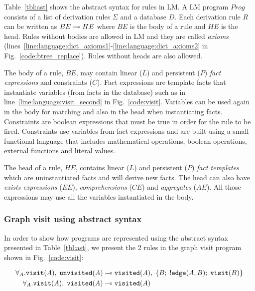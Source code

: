 Table~\ref{tbl:ast} shows the abstract syntax for rules in LM.  A LM program
$Prog$ consists of a list of derivation rules $\Sigma$ and a database $D$.  Each
derivation rule $R$ can be written as $BE \multimap HE$ where $BE$ is the body of a
rule and $HE$ is the head. Rules without bodies are allowed in LM and they are
called \textit{axioms}
(lines~\ref{line:language:dict_axioms1}-\ref{line:language:dict_axioms2} in
Fig.~\ref{code:btree_replace}). Rules without heads are also allowed.

The body of a rule, $BE$, may contain linear ($L$) and persistent ($P$)
\emph{fact expressions} and constraints ($C$). Fact expressions are template
facts that instantiate variables (from facts in the database) such as
 in line~\ref{line:language:visit_second} in
Fig.~\ref{code:visit}. Variables can be used again in the body for matching and
also in the head when instantiating facts.  Constraints are boolean expressions
that must be true in order for the rule to be fired. Constraints use variables
from fact expressions and are built using a small functional language that
includes mathematical operations, boolean operations, external functions and
literal values.

The head of a rule, $HE$, contains linear ($L$) and persistent ($P$) \emph{fact
templates} which are uninstantiated facts and will derive new facts. The head
can also have \emph{exists expressions} ($EE$), \emph{comprehensions} ($CE$)
and \emph{aggregates} ($AE$). All those expressions may use all the variables
instantiated in the body.

\subsubsection{Graph visit using abstract syntax}\label{visit:ast}

In order to show how programs are represented using the abstract syntax
presented in Table~\ref{tbl:ast}, we present the 2 rules in the graph visit
program shown in Fig.~\ref{code:visit}:

\nopagebreak

\begin{align}
\forall_A. \mathtt{visit}(A), \; \mathtt{unvisited}(A) \multimap & \;
\mathtt{visited}(A), \; \{ B; \; {!} \mathtt{edge}(A, B); \;
\mathtt{visit}(B)\}\\
\forall_A. \mathtt{visit}(A), \; \mathtt{visited}(A) \multimap & \;
\mathtt{visited}(A)
\end{align}

